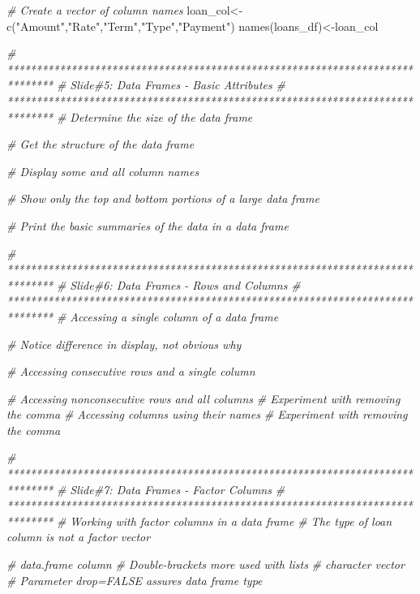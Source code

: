 \documentclass[
]{article}
\newenvironment{Shaded}{\begin{snugshade}}{\end{snugshade}}
\newcommand{\CommentTok}[1]{\textcolor[rgb]{0.56,0.35,0.01}{\textit{#1}}}
\newcommand{\FunctionTok}[1]{\textcolor[rgb]{0.00,0.00,0.00}{#1}}
\newcommand{\NormalTok}[1]{#1}
\newcommand{\OtherTok}[1]{\textcolor[rgb]{0.56,0.35,0.01}{#1}}
\newcommand{\StringTok}[1]{\textcolor[rgb]{0.31,0.60,0.02}{#1}}
\begin{document}
\begin{Shaded}
\begin{Highlighting}[]
\CommentTok{\# Create a vector of column names}
\NormalTok{loan\_col}\OtherTok{\textless{}{-}}\FunctionTok{c}\NormalTok{(}\StringTok{"Amount"}\NormalTok{,}\StringTok{"Rate"}\NormalTok{,}\StringTok{"Term"}\NormalTok{,}\StringTok{"Type"}\NormalTok{,}\StringTok{"Payment"}\NormalTok{)}
\FunctionTok{names}\NormalTok{(loans\_df)}\OtherTok{\textless{}{-}}\NormalTok{loan\_col}


\CommentTok{\# ******************************************************************************}
\CommentTok{\# Slide\#5: Data Frames {-} Basic Attributes}
\CommentTok{\# ******************************************************************************}
\CommentTok{\# Determine the size of the data frame}



\CommentTok{\# Get the structure of the data frame}

\CommentTok{\# Display some and all column names}

\CommentTok{\# Show only the top and bottom portions of a large data frame}

\CommentTok{\# Print the basic summaries of the data in a data frame}


\CommentTok{\# ******************************************************************************}
\CommentTok{\# Slide\#6: Data Frames {-} Rows and Columns}
\CommentTok{\# ******************************************************************************}
\CommentTok{\# Accessing a single column of a data frame}

\CommentTok{\# Notice difference in display, not obvious why}

\CommentTok{\# Accessing consecutive rows and a single column}

\CommentTok{\# Accessing nonconsecutive rows and all columns}
                \CommentTok{\# Experiment with removing the comma}
\CommentTok{\# Accessing columns using their names}
                \CommentTok{\# Experiment with removing the comma}

\CommentTok{\# ******************************************************************************}
\CommentTok{\# Slide\#7: Data Frames {-} Factor Columns}
\CommentTok{\# ******************************************************************************}
\CommentTok{\# Working with factor columns in a data frame}
\CommentTok{\# The type of loan column is not a factor vector}

            \CommentTok{\# data.frame column}
            \CommentTok{\# Double{-}brackets more used with lists}
            \CommentTok{\# character vector}
\CommentTok{\# Parameter drop=FALSE assures data frame type}


\end{Highlighting}
\end{Shaded}
\end{document}
